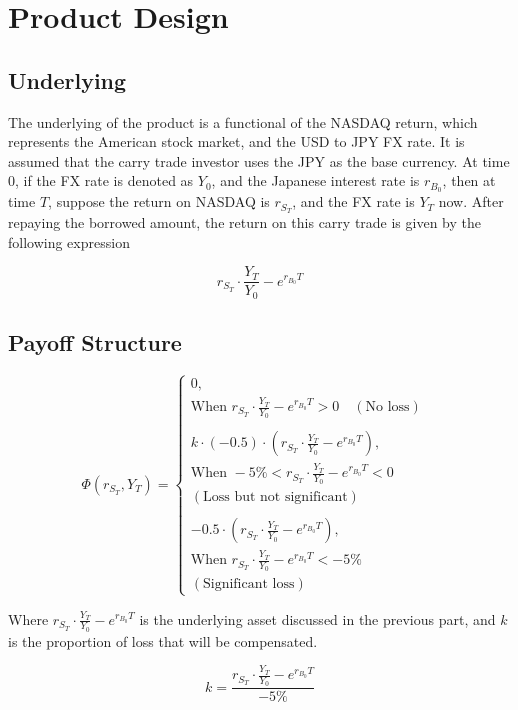 \documentclass[a4paper, twocolumn]{article}
\begin{document}
\section{Product Design}

\subsection{Underlying}

The underlying of the product is a functional of the NASDAQ return, which represents the American stock market, and the USD to JPY FX rate. It is assumed that the carry trade investor uses the JPY as the base currency.
At time \(0\), if the FX rate is denoted as \(Y_0\), and the Japanese interest rate is \(r_{B_0}\), then at time \(T\), suppose the return on NASDAQ is \(r_{S_T}\), and the FX rate is \(Y_T\) now. After repaying the borrowed amount, the return on this carry trade is given by the following expression

\[
r_{S_T} \cdot \frac{Y_T}{Y_0} - e^{r_{B_0} T}
\]

\subsection{Payoff Structure}

\[
\Phi(r_{S_{T}}, Y_T) = 
\begin{cases} 
0, & \\
\text{When } r_{S_{T}} \cdot \frac{Y_T}{Y_0} - e^{r_{B_0} T} > 0 \quad (\text{No loss}) 
\\
\\
k \cdot (-0.5) \cdot \left(r_{S_{T}} \cdot \frac{Y_T}{Y_0} - e^{r_{B_0} T}\right), & \\
\text{When } -5\% < r_{S_{T}} \cdot \frac{Y_T}{Y_0} - e^{r_{B_0} T} < 0 \quad \\(\text{Loss but not significant}) \\
\\
-0.5 \cdot \left(r_{S_{T}} \cdot \frac{Y_T}{Y_0} - e^{r_{B_0} T}\right), & \\
\text{When } r_{S_{T}} \cdot \frac{Y_T}{Y_0} - e^{r_{B_0} T} < -5\% \quad \\(\text{Significant loss}) &
\end{cases}
\]

Where \( r_{S_{T}} \cdot \frac{Y_T}{Y_0} - e^{r_{B_0} T} \) is the underlying asset discussed in the previous part, and \(k\) is the proportion of loss that will be compensated.

\[
k = \frac{r_{S_{T}} \cdot \frac{Y_T}{Y_0} - e^{r_{B_0} T}}{-5\%}
\]
\end{document}
